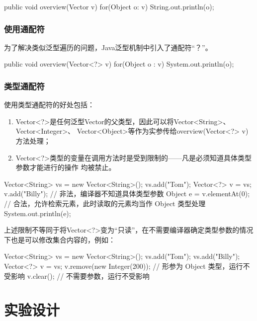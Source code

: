 \begin{javaCode}
  public void overview(Vector v) {
    for(Object o: v) {
      String.out.println(o);
    }
  }
\end{javaCode}

\subsubsection{使用通配符}

为了解决类似泛型遍历的问题，Java泛型机制中引入了通配符“？”。

\begin{javaCode}
  public void overview(Vector<?> v) {
    for(Object o : v) {
      System.out.println(o);
    }
  }
\end{javaCode}

\subsubsection{类型通配符}

使用类型通配符的好处包括：

\begin{enumerate}
\item Vector<?>是任何泛型Vector的父类型，因此可以将Vector<String>、Vector<Integer>、
  Vector<Object>等作为实参传给overview(Vector<?> v)方法处理；
\item Vector<?>类型的变量在调用方法时是受到限制的——凡是必须知道具体类型参数才能进行的操作
  均被禁止。
\end{enumerate}

\begin{javaCode}
  Vector<String> vs = new Vector<String>();
  vs.add("Tom");
  Vector<?> v = vs;
  v.add("Billy");  // 非法，编译器不知道具体类型参数
  Object e = v.elementAt(0); // 合法，允许检索元素，此时读取的元素均当作 Object 类型处理
  System.out.println(e);
\end{javaCode}

上述限制不等同于将Vector<?>变为“只读”，在不需要编译器确定类型参数的情况
下也是可以修改集合内容的，例如：
\begin{javaCode}
  Vector<String> vs = new Vector<String>();
  vs.add("Tom");
  vs.add("Billy");
  Vector<?> v = vs;
  v.remove(new Integer(200));  // 形参为 Object 类型，运行不受影响
  v.clear(); // 不需要参数，运行不受影响
\end{javaCode}

\newpage
\section*{实验设计}
\sline